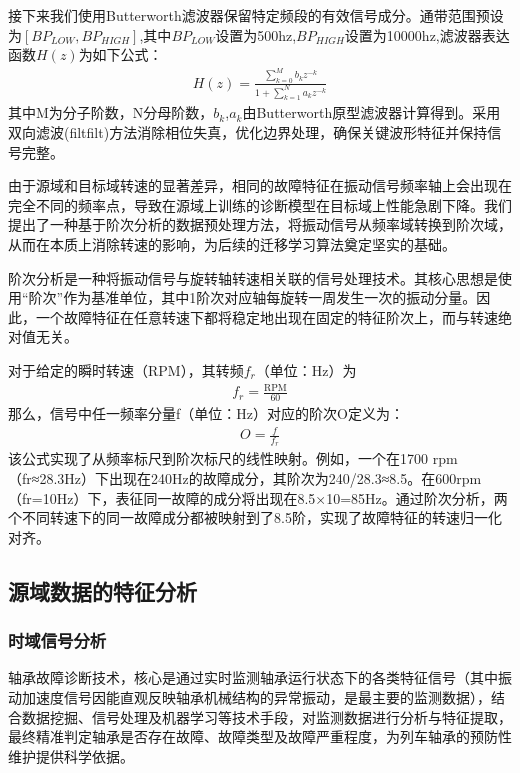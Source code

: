 \documentclass[a4paper]{CPIPC}
\numberwithin{equation}{section}
\begin{document}
接下来我们使用Butterworth滤波器保留特定频段的有效信号成分。通带范围预设为$[BP_{LOW}, BP_{HIGH}]$,其中$BP_{LOW}$设置为500hz,$BP_{HIGH}$设置为10000hz,滤波器表达函数$H(z)$为如下公式：
\begin{align}
 H(z) = \frac{\sum_{k=0}^{M} b_k z^{-k}}{1 + \sum_{k=1}^{N} a_k z^{-k}} 
\end{align}
其中M为分子阶数，N分母阶数，$b_k$,$a_k$由Butterworth原型滤波器计算得到。采用双向滤波(filtfilt)方法消除相位失真，优化边界处理，确保关键波形特征并保持信号完整。

由于源域和目标域转速的显著差异，相同的故障特征在振动信号频率轴上会出现在完全不同的频率点，导致在源域上训练的诊断模型在目标域上性能急剧下降。我们提出了一种基于阶次分析的数据预处理方法，将振动信号从频率域转换到阶次域，从而在本质上消除转速的影响，为后续的迁移学习算法奠定坚实的基础。

阶次分析是一种将振动信号与旋转轴转速相关联的信号处理技术。其核心思想是使用“阶次”作为基准单位，其中1阶次对应轴每旋转一周发生一次的振动分量。因此，一个故障特征在任意转速下都将稳定地出现在固定的特征阶次上，而与转速绝对值无关\cite{ref2}。

对于给定的瞬时转速（RPM），其转频$f_r$（单位：Hz）为
\begin{align}
 f_r = \frac{\text{RPM}}{60} 
\end{align}
那么，信号中任一频率分量f（单位：Hz）对应的阶次O定义为：
\begin{align}
 O = \frac{f}{f_r} 
\end{align}
该公式实现了从频率标尺到阶次标尺的线性映射。例如，一个在1700 rpm（fr≈28.3Hz）下出现在240Hz的故障成分，其阶次为240/28.3≈8.5。在600rpm（fr=10Hz）下，表征同一故障的成分将出现在8.5×10=85Hz。通过阶次分析，两个不同转速下的同一故障成分都被映射到了8.5阶，实现了故障特征的转速归一化对齐。


\subsection{源域数据的特征分析}
\subsubsection{时域信号分析}

轴承故障诊断技术，核心是通过实时监测轴承运行状态下的各类特征信号（其中振动加速度信号因能直观反映轴承机械结构的异常振动，是最主要的监测数据），结合数据挖掘、信号处理及机器学习等技术手段，对监测数据进行分析与特征提取，最终精准判定轴承是否存在故障、故障类型及故障严重程度，为列车轴承的预防性维护提供科学依据。
\end{document}
